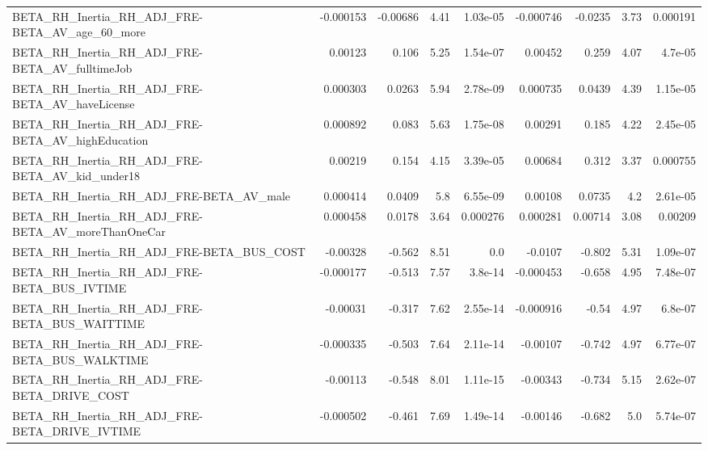 \begin{tabular}{lrrrrrrrr}
BETA\_RH\_Inertia\_RH\_ADJ\_FRE-BETA\_AV\_age\_60\_more     &   -0.000153 &     -0.00686 &     4.41 & 1.03e-05 &  -0.000746 &     -0.0235 &         3.73 &      0.000191 \\
BETA\_RH\_Inertia\_RH\_ADJ\_FRE-BETA\_AV\_fulltimeJob     &     0.00123 &        0.106 &     5.25 & 1.54e-07 &    0.00452 &       0.259 &         4.07 &       4.7e-05 \\
BETA\_RH\_Inertia\_RH\_ADJ\_FRE-BETA\_AV\_haveLicense     &    0.000303 &       0.0263 &     5.94 & 2.78e-09 &   0.000735 &      0.0439 &         4.39 &      1.15e-05 \\
BETA\_RH\_Inertia\_RH\_ADJ\_FRE-BETA\_AV\_highEducation   &    0.000892 &        0.083 &     5.63 & 1.75e-08 &    0.00291 &       0.185 &         4.22 &      2.45e-05 \\
BETA\_RH\_Inertia\_RH\_ADJ\_FRE-BETA\_AV\_kid\_under18     &     0.00219 &        0.154 &     4.15 & 3.39e-05 &    0.00684 &       0.312 &         3.37 &      0.000755 \\
BETA\_RH\_Inertia\_RH\_ADJ\_FRE-BETA\_AV\_male            &    0.000414 &       0.0409 &      5.8 & 6.55e-09 &    0.00108 &      0.0735 &          4.2 &      2.61e-05 \\
BETA\_RH\_Inertia\_RH\_ADJ\_FRE-BETA\_AV\_moreThanOneCar  &    0.000458 &       0.0178 &     3.64 & 0.000276 &   0.000281 &     0.00714 &         3.08 &       0.00209 \\
BETA\_RH\_Inertia\_RH\_ADJ\_FRE-BETA\_BUS\_COST           &    -0.00328 &       -0.562 &     8.51 &      0.0 &    -0.0107 &      -0.802 &         5.31 &      1.09e-07 \\
BETA\_RH\_Inertia\_RH\_ADJ\_FRE-BETA\_BUS\_IVTIME         &   -0.000177 &       -0.513 &     7.57 &  3.8e-14 &  -0.000453 &      -0.658 &         4.95 &      7.48e-07 \\
BETA\_RH\_Inertia\_RH\_ADJ\_FRE-BETA\_BUS\_WAITTIME       &    -0.00031 &       -0.317 &     7.62 & 2.55e-14 &  -0.000916 &       -0.54 &         4.97 &       6.8e-07 \\
BETA\_RH\_Inertia\_RH\_ADJ\_FRE-BETA\_BUS\_WALKTIME       &   -0.000335 &       -0.503 &     7.64 & 2.11e-14 &   -0.00107 &      -0.742 &         4.97 &      6.77e-07 \\
BETA\_RH\_Inertia\_RH\_ADJ\_FRE-BETA\_DRIVE\_COST         &    -0.00113 &       -0.548 &     8.01 & 1.11e-15 &   -0.00343 &      -0.734 &         5.15 &      2.62e-07 \\
BETA\_RH\_Inertia\_RH\_ADJ\_FRE-BETA\_DRIVE\_IVTIME       &   -0.000502 &       -0.461 &     7.69 & 1.49e-14 &   -0.00146 &      -0.682 &          5.0 &      5.74e-07 \\

\end{tabular}
